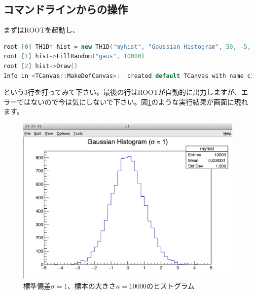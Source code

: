 \subsection{コマンドラインからの操作}
まずはROOTを起動し、
\begin{lstlisting}[language=c++]
root [0] TH1D* hist = new TH1D("myhist", "Gaussian Histogram", 50, -5, 5)
root [1] hist->FillRandom("gaus", 10000)
root [2] hist->Draw()
Info in <TCanvas::MakeDefCanvas>:  created default TCanvas with name c1
\end{lstlisting}
という3行を打ってみて下さい。最後の行はROOTが自動的に出力しますが、エラーではないので今は気にしないで下さい。図\ref{fig_first_script}のような実行結果が画面に現れます。
\begin{figure}
  \centering
  \includegraphics[width=12cm,bb= 0 0 1400 1044]{fig/first_script.png}
  \caption{標準偏差$\sigma=1$、標本の大きさ$n=10000$のヒストグラム}
  \label{fig_first_script}
\end{figure}

